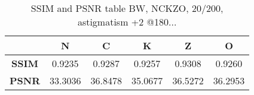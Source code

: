 
\begin{table}[h]
	\centering
	\label{table:metrics_astig+2@180_bw}
	\caption[???]{SSIM and PSNR table BW, NCKZO, 20/200, astigmatism +2 @180...}

	\begin{tabular}{cccccc}
	{\bf }                          & {\bf N} & {\bf C} & {\bf K} & {\bf Z} & {\bf O} \\ \hline
	\multicolumn{1}{c|}{{\bf SSIM}} & 0.9235  & 0.9287  & 0.9257  & 0.9308  & 0.9260  		\\
	\multicolumn{1}{c|}{{\bf PSNR}} & 33.3036 & 36.8478 & 35.0677 & 36.5272 & 36.2953
	\end{tabular}
\end{table}